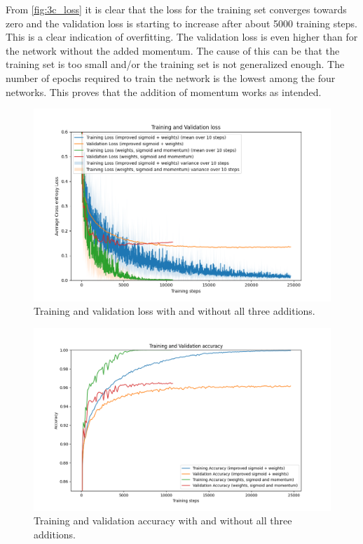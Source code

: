 \documentclass{article}
\begin{document}
From \autoref{fig:3c_loss} it is clear that the loss for the training set converges towards zero and the validation loss is starting to increase after about 5000 training steps. This is a clear indication of overfitting. The validation loss is even higher than for the network without the added momentum. The cause of this can be that the training set is too small and/or the training set is not generalized enough. The number of epochs required to train the network is the lowest among the four networks. This proves that the addition of momentum works as intended.

\begin{figure}[H]
    \centering
    \includegraphics[width = \textwidth]{Assignments/Assignment_2/plots/task3/3c_loss.png}
    \caption{Training and validation loss with and without all three additions.}
    \label{fig:3c_loss}
\end{figure}

\begin{figure}[H]
    \centering
    \includegraphics[width = \textwidth]{Assignments/Assignment_2/plots/task3/3c_accuracy.png}
    \caption{Training and validation accuracy with and without all three additions.}
    \label{fig:3c_acc}
\end{figure}
\end{document}
